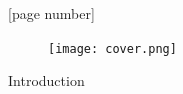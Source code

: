 \documentclass[hyperref={pdfpagelabels=true}]{beamer}
\begin{document}
\captionsetup{font=scriptsize,labelfont=scriptsize}

[page number]


 \begin{frame}
\huge
{ \centering
\begin{figure}
\texttt{[image: cover.png]}
\end{figure}
}
\end{frame}

 \begin{frame}
\huge
{ \centering
Introduction}
\end{frame}
 
\end{document}
